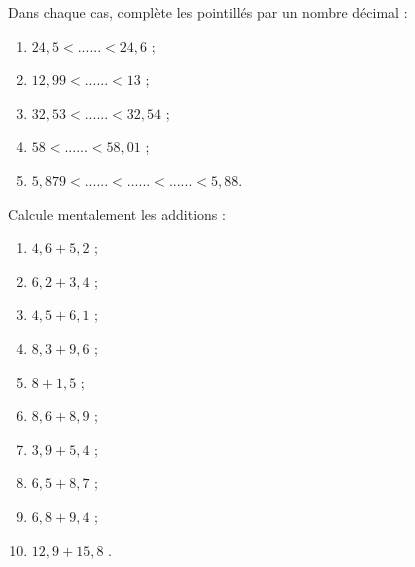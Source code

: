 \begin{exercice}
Dans chaque cas, complète les pointillés par un nombre décimal :
\begin{enumerate} 
 \item $24,5 < ...... < 24,6$ ;  
 
 \item $12,99 < ...... < 13$ ; 
 
 \item $32,53 < ...... < 32,54$ ; 
 
 \item $58 < ...... < 58,01$ ; 
 
 \item $5,879 < ...... < ...... < ...... < 5,88$. 

 \end{enumerate}
\end{exercice}




\newpage    %





\begin{exercice}
Calcule mentalement les additions :
\begin{enumerate} 
 \item $4,6 + 5,2$ \dotfill ; 
 
 \item $6,2 + 3,4$ \dotfill ; 
 
 \item $4,5 + 6,1$ \dotfill ; 
 
 \item $8,3 + 9,6$ \dotfill ; 
 
 \item $8 + 1,5$ \dotfill ; 
 
 \item $8,6 + 8,9$ \dotfill ; 
 
 \item $3,9 + 5,4$ \dotfill ; 
 
 \item $6,5 + 8,7$ \dotfill ; 
 
 \item $6,8 + 9,4$ \dotfill ; 
 
 \item \hspace{0.1em} $12,9 + 15,8$ \dotfill. 

 \end{enumerate}
\end{exercice}


